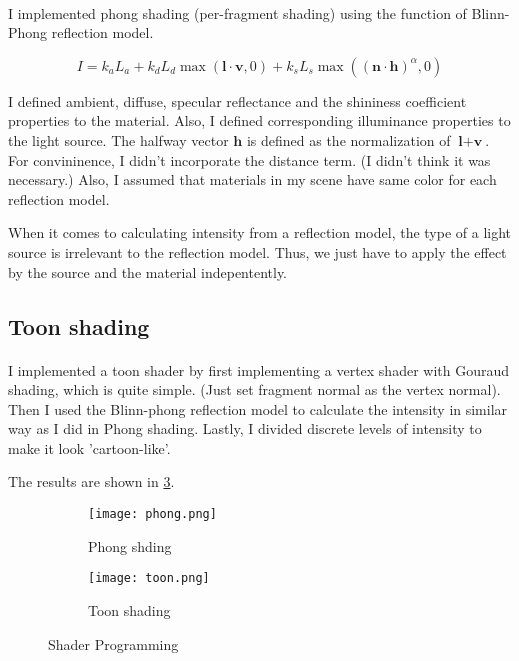 \documentclass[10pt,a4paper]{article}
\begin{document}
	\paragraph{}
	I implemented phong shading (per-fragment shading) using the function of Blinn-Phong reflection model.
	
	$$ I = k_a L_a + k_d L_d \max (\textbf{l}\cdot \textbf{v}, 0) + k_s L_s \max ((\textbf{n}\cdot \textbf{h})^\alpha, 0) $$
	
	I defined ambient, diffuse, specular reflectance and the shininess coefficient properties to the material. Also, I defined corresponding illuminance properties to the light source. The halfway vector $ \textbf{h} $ is defined as the normalization of $ \textbf{l} + \textbf{v} $. For convininence, I didn't incorporate the distance term. (I didn't think it was necessary.) Also, I assumed that materials in my scene have same color for each reflection model.
	
	When it comes to calculating intensity from a reflection model, the type of a light source is irrelevant to the reflection model. Thus, we just have to apply the effect by the source and the material indepentently.
	
	\subsection{Toon shading}
	\paragraph{}
	
	I implemented a toon shader by first implementing a vertex shader with Gouraud shading, which is quite simple. (Just set fragment normal as the vertex normal). Then I used the Blinn-phong reflection model to calculate the intensity in similar way as I did in Phong shading. Lastly, I divided discrete levels of intensity to make it look 'cartoon-like'.
	
	The results are shown in \ref{fig:shader}.
	
	\begin{figure}
		\begin{subfigure}{0.5\linewidth}
			\centering
			\texttt{[image: phong.png]}
			\caption{Phong shding}
			\label{fig:phong}
		\end{subfigure}
		\begin{subfigure}{0.5\linewidth}
			\centering
			\texttt{[image: toon.png]}
			\caption{Toon shading}
			\label{fig:toon}
		\end{subfigure}
		\caption{Shader Programming}
		\label{fig:shader}
	\end{figure}	
\end{document}
